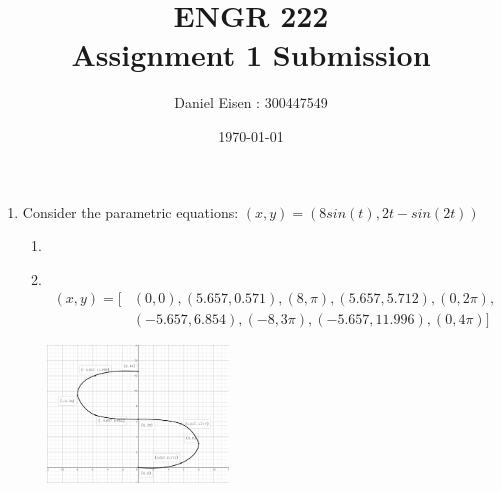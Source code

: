 \documentclass[11pt]{article}
\title{ENGR 222 \\ Assignment 1 Submission}
\author{Daniel Eisen : 300447549}
\date{\today}
\newcommand\Item[1][]{%
  \ifx\relax#1\relax  \item \else \item[#1] \fi
  \abovedisplayskip=0pt\abovedisplayshortskip=0pt~\vspace*{-\baselineskip}}
\begin{document}
\maketitle
\begin{enumerate}
    \item Consider the parametric equations:
    $(x,y) = (8sin(t),2t-sin(2t))$
    \begin{enumerate}
        \Item 
        \begin{align*}
            (x,y) = [&(0,0),(5.657,0.571),(8,\pi),(5.657,5.712),(0,2\pi),\\
                  &(-5.657,6.854),(-8,3\pi),(-5.657,11.996),(0,4\pi)]
        \end{align*}

        \begin{center}
            \includegraphics[width=0.4\textwidth]{inc/1a.png}
        \end{center}


\end{enumerate}
\end{enumerate}
\end{document}

